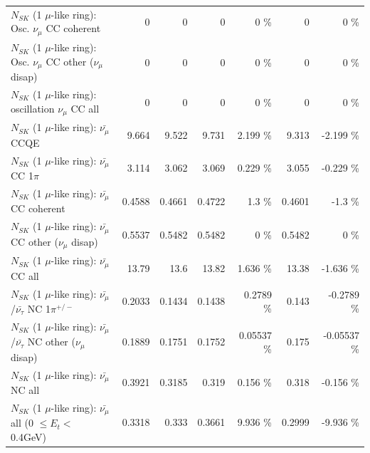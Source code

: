 \begin{table}
\begin{tabular}{| l | r | r | r  r | r  r |}
                        $N_{SK}$ (1 $\mu$-like ring): Osc. $\nu_\mu$ CC coherent &               0 &               0 &               0 &        0 \%  &               0 &        0 \%  \\ 
         $N_{SK}$ (1 $\mu$-like ring): Osc. $\nu_\mu$ CC other ($\nu_\mu$ disap) &               0 &               0 &               0 &        0 \%  &               0 &        0 \%  \\ 
                      $N_{SK}$ (1 $\mu$-like ring): oscillation $\nu_\mu$ CC all &               0 &               0 &               0 &        0 \%  &               0 &        0 \%  \\ 
\hline
\hline
                              $N_{SK}$ (1 $\mu$-like ring): $\bar{\nu_\mu}$ CCQE &           9.664 &           9.522 &           9.731 &    2.199 \%  &           9.313 &   -2.199 \%  \\ 
                         $N_{SK}$ (1 $\mu$-like ring): $\bar{\nu_\mu}$ CC 1$\pi$ &           3.114 &           3.062 &           3.069 &    0.229 \%  &           3.055 &   -0.229 \%  \\ 
                       $N_{SK}$ (1 $\mu$-like ring): $\bar{\nu_\mu}$ CC coherent &          0.4588 &          0.4661 &          0.4722 &      1.3 \%  &          0.4601 &     -1.3 \%  \\ 
        $N_{SK}$ (1 $\mu$-like ring): $\bar{\nu_\mu}$ CC other ($\nu_\mu$ disap) &          0.5537 &          0.5482 &          0.5482 &        0 \%  &          0.5482 &        0 \%  \\ 
                          $N_{SK}$ (1 $\mu$-like ring): $\bar{\nu_{\mu}}$ CC all &           13.79 &            13.6 &           13.82 &    1.636 \%  &           13.38 &   -1.636 \%  \\ 
\hline
  $N_{SK}$ (1 $\mu$-like ring): $\bar{\nu_\mu}$/$\bar{\nu_\tau}$ NC 1$\pi^{+/-}$ &          0.2033 &          0.1434 &          0.1438 &   0.2789 \%  &           0.143 &  -0.2789 \%  \\ 
$N_{SK}$ (1 $\mu$-like ring): $\bar{\nu_\mu}$/$\bar{\nu_\tau}$ NC other ($\nu_\mu$ disap) &          0.1889 &          0.1751 &          0.1752 &  0.05537 \%  &           0.175 & -0.05537 \%  \\ 
                          $N_{SK}$ (1 $\mu$-like ring): $\bar{\nu_{\mu}}$ NC all &          0.3921 &          0.3185 &           0.319 &    0.156 \%  &           0.318 &   -0.156 \%  \\ 
\hline
   $N_{SK}$ (1 $\mu$-like ring): $\bar{\nu_{\mu}}$ all (0 $\leq E_{t} <$ 0.4GeV) &          0.3318 &           0.333 &          0.3661 &    9.936 \%  &          0.2999 &   -9.936 \%  \\ 

\end{tabular}
\end{table}
